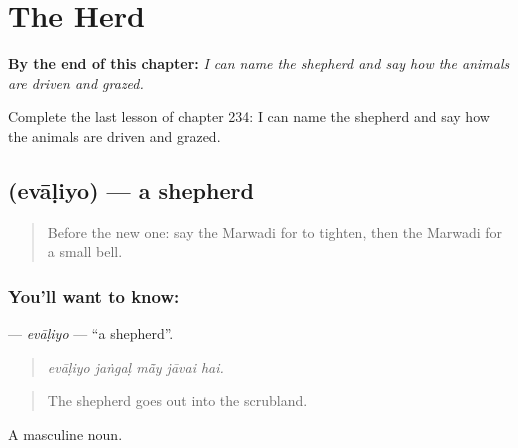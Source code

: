 
\chapter{The Herd}
\label{ch:mw-the-herd}

\begin{chapteropening}
\textbf{By the end of this chapter:} \emph{I can name the shepherd and say how the animals are driven and grazed.}

Complete the last lesson of chapter 234: I can name the shepherd and say how the animals are driven and grazed.
\end{chapteropening}

\section[\texorpdfstring{\mw{एवाळियो} (evāḷiyo)}{एवाळियो (evāḷiyo)}]{ (evāḷiyo) — a shepherd}

\label{lesson:MW-C234-evaliyo}



\begin{quote}
Before the new one: say the Marwadi for to tighten, then the Marwadi for a small bell.
\end{quote}

\subsection*{You'll want to know: }
\textbf{} — \emph{evāḷiyo} — \textquotedblleft{}a shepherd\textquotedblright{}.

\begin{quote}
    
\end{quote}

\begin{quote}
\emph{evāḷiyo jaṅgaḷ mā̃y jāvai hai.}
\end{quote}

\begin{quote}
The shepherd goes out into the scrubland.
\end{quote}

A masculine noun.

